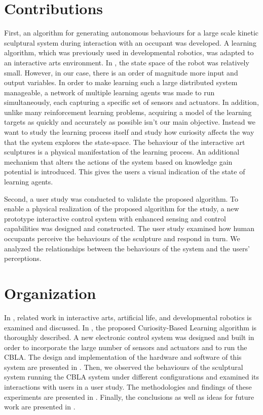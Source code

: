 \section{Contributions}

First, an algorithm for generating autonomous behaviours for a large scale kinetic sculptural system during interaction with an occupant was developed. A learning algorithm, which was previously used in developmental robotics, was adapted to an interactive arts environment. In \cite{Oudeyer2007}, the state space of the robot was relatively small. However, in our case, there is an order of magnitude more input and output variables. In order to make learning such a large distributed system manageable, a network of multiple learning agents was made to run simultaneously, each capturing a specific set of sensors and actuators. In addition, unlike many reinforcement learning problems, acquiring a model of the learning targets as quickly and accurately as possible isn't our main objective. Instead we want to study the learning process itself and study how curiosity affects the way that the system explores the state-space. The behaviour of the interactive art sculptures is a physical manifestation of the learning process. An additional mechanism that alters the actions of the system based on knowledge gain potential is introduced. This gives the users a visual indication of the state of learning agents.  

Second, a user study was conducted to validate the proposed algorithm. To enable a physical realization of the proposed algorithm for the study, a new prototype interactive control system with enhanced sensing and control capabilities was designed and constructed. The user study examined how human occupants perceive the behaviours of the sculpture and respond in turn. We analyzed the relationships between the behaviours of the system and the users' perceptions. 


\section{Organization}

In , related work in interactive arts, artificial life, and developmental robotics is examined and discussed. In , the proposed Curiosity-Based Learning algorithm is thoroughly described. A new electronic control system was designed and built in order to incorporate the large number of sensors and actuators and to run the CBLA. The design and implementation of the hardware and software of this system are presented in . Then, we observed the behaviours of the sculptural system running the CBLA system under different configurations and examined its interactions with users in a user study. The methodologies and findings of these experiments are presented in . Finally, the conclusions as well as ideas for future work are presented in .
